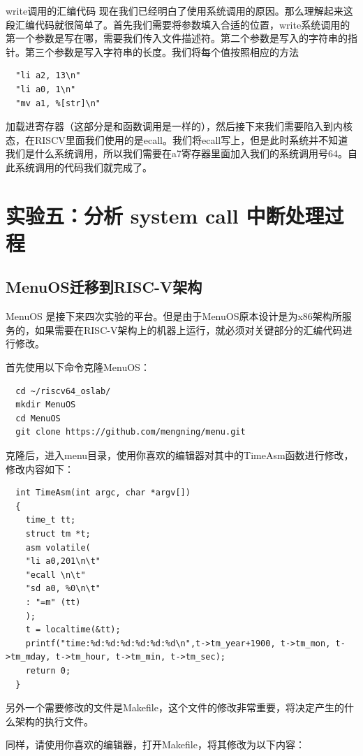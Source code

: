 \documentclass[lang=cn,10pt]{elegantbook}
\begin{document}
write调用的汇编代码
现在我们已经明白了使用系统调用的原因。那么理解起来这段汇编代码就很简单了。首先我们需要将参数填入合适的位置，write系统调用的第一个参数是写在哪，需要我们传入文件描述符。第二个参数是写入的字符串的指针。第三个参数是写入字符串的长度。我们将每个值按照相应的方法
\begin{lstlisting}
  "li a2, 13\n" 
  "li a0, 1\n" 
  "mv a1, %[str]\n"
\end{lstlisting}

加载进寄存器（这部分是和函数调用是一样的），然后接下来我们需要陷入到内核态，在RISCV里面我们使用的是ecall。我们将ecall写上，但是此时系统并不知道我们是什么系统调用，所以我们需要在a7寄存器里面加入我们的系统调用号64。自此系统调用的代码我们就完成了。

\chapter{实验五：分析 system call 中断处理过程}

\section{MenuOS迁移到RISC-V架构}
MenuOS 是接下来四次实验的平台。但是由于MenuOS原本设计是为x86架构所服务的，如果需要在RISC-V架构上的机器上运行，就必须对关键部分的汇编代码进行修改。

首先使用以下命令克隆MenuOS：

\begin{lstlisting}
  cd ~/riscv64_oslab/
  mkdir MenuOS
  cd MenuOS
  git clone https://github.com/mengning/menu.git
\end{lstlisting}

克隆后，进入menu目录，使用你喜欢的编辑器对其中的TimeAsm函数进行修改，修改内容如下：

\begin{lstlisting}
  int TimeAsm(int argc, char *argv[])
  {
    time_t tt;
    struct tm *t;
    asm volatile(
    "li a0,201\n\t"
    "ecall \n\t"
    "sd a0, %0\n\t"
    : "=m" (tt)
    );
    t = localtime(&tt);
    printf("time:%d:%d:%d:%d:%d:%d\n",t->tm_year+1900, t->tm_mon, t->tm_mday, t->tm_hour, t->tm_min, t->tm_sec);
    return 0;
  }
\end{lstlisting}
另外一个需要修改的文件是Makefile，这个文件的修改非常重要，将决定产生的什么架构的执行文件。

同样，请使用你喜欢的编辑器，打开Makefile，将其修改为以下内容：
\end{document}
